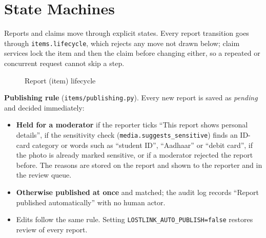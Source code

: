 \documentclass[12pt,a4paper,oneside]{report}
\newcommand{\code}[1]{\texttt{#1}}
\begin{document}
\section{State Machines}
Reports and claims move through explicit states. Every report transition goes through \code{items.lifecycle}, which rejects any move not drawn below; claim services lock the item and then the claim before changing either, so a repeated or concurrent request cannot skip a step.
\begin{figure}[!htbp]
\centering
{}
\caption{Report (item) lifecycle}
\end{figure}

\noindent\textbf{Publishing rule} (\code{items/publishing.py}). Every new report is saved as \emph{pending} and decided immediately:
\begin{itemize}
  \item \textbf{Held for a moderator} if the reporter ticks ``This report shows personal details'', if the sensitivity check (\code{media.suggests\_sensitive}) finds an ID-card category or words such as ``student ID'', ``Aadhaar'' or ``debit card'', if the photo is already marked sensitive, or if a moderator rejected the report before. The reasons are stored on the report and shown to the reporter and in the review queue.
  \item \textbf{Otherwise published at once} and matched; the audit log records ``Report published automatically'' with no human actor.
  \item Edits follow the same rule. Setting \code{LOSTLINK\_AUTO\_PUBLISH=false} restores review of every report.
\end{itemize}
\end{document}
